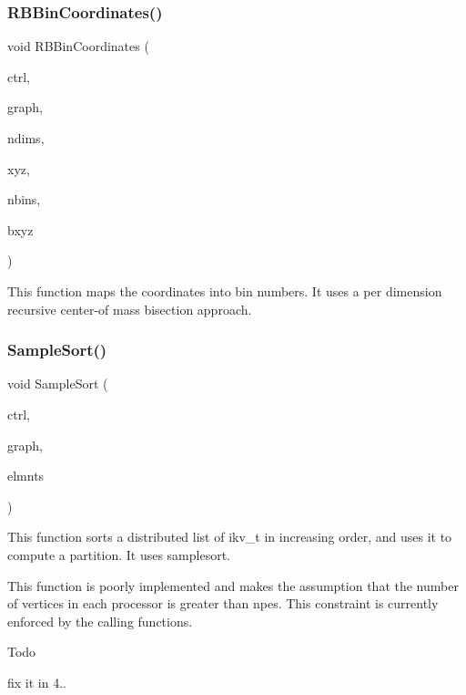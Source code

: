 \subsubsection{\texorpdfstring{R\+B\+Bin\+Coordinates()}{RBBinCoordinates()}}
{\footnotesize\ttfamily void R\+B\+Bin\+Coordinates (\begin{DoxyParamCaption}\item[{\hyperlink{a00742}{ctrl\+\_\+t} $\ast$}]{ctrl,  }\item[{\hyperlink{a00734}{graph\+\_\+t} $\ast$}]{graph,  }\item[{\hyperlink{a00876_aaa5262be3e700770163401acb0150f52}{idx\+\_\+t}}]{ndims,  }\item[{\hyperlink{a00876_a1924a4f6907cc3833213aba1f07fcbe9}{real\+\_\+t} $\ast$}]{xyz,  }\item[{\hyperlink{a00876_aaa5262be3e700770163401acb0150f52}{idx\+\_\+t}}]{nbins,  }\item[{\hyperlink{a00876_aaa5262be3e700770163401acb0150f52}{idx\+\_\+t} $\ast$}]{bxyz }\end{DoxyParamCaption})}

This function maps the coordinates into bin numbers. It uses a per dimension recursive center-\/of mass bisection approach. \mbox{\label{a00419_a2143bf929ebccf74747b328617eb619a}} 
\subsubsection{\texorpdfstring{Sample\+Sort()}{SampleSort()}}
{\footnotesize\ttfamily void Sample\+Sort (\begin{DoxyParamCaption}\item[{\hyperlink{a00742}{ctrl\+\_\+t} $\ast$}]{ctrl,  }\item[{\hyperlink{a00734}{graph\+\_\+t} $\ast$}]{graph,  }\item[{ikv\+\_\+t $\ast$}]{elmnts }\end{DoxyParamCaption})}

This function sorts a distributed list of ikv\+\_\+t in increasing order, and uses it to compute a partition. It uses samplesort.

This function is poorly implemented and makes the assumption that the number of vertices in each processor is greater than npes. This constraint is currently enforced by the calling functions. \begin{DoxyRefDesc}{Todo}
\item[\hyperlink{a00626__todo000002}{Todo}]fix it in 4.. \end{DoxyRefDesc}
